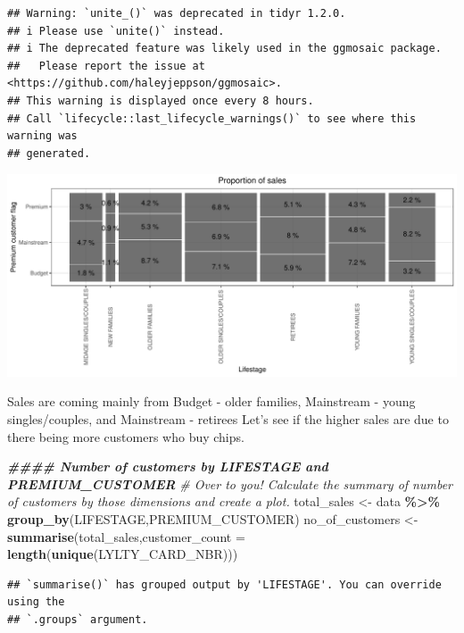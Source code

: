 \documentclass[
]{article}
\newenvironment{Shaded}{\begin{snugshade}}{\end{snugshade}}
\newcommand{\AttributeTok}[1]{\textcolor[rgb]{0.13,0.29,0.53}{#1}}
\newcommand{\CommentTok}[1]{\textcolor[rgb]{0.56,0.35,0.01}{\textit{#1}}}
\newcommand{\DocumentationTok}[1]{\textcolor[rgb]{0.56,0.35,0.01}{\textbf{\textit{#1}}}}
\newcommand{\FunctionTok}[1]{\textcolor[rgb]{0.13,0.29,0.53}{\textbf{#1}}}
\newcommand{\NormalTok}[1]{#1}
\newcommand{\OtherTok}[1]{\textcolor[rgb]{0.56,0.35,0.01}{#1}}
\newcommand{\SpecialCharTok}[1]{\textcolor[rgb]{0.81,0.36,0.00}{\textbf{#1}}}
\begin{document}
\begin{verbatim}
## Warning: `unite_()` was deprecated in tidyr 1.2.0.
## i Please use `unite()` instead.
## i The deprecated feature was likely used in the ggmosaic package.
##   Please report the issue at <https://github.com/haleyjeppson/ggmosaic>.
## This warning is displayed once every 8 hours.
## Call `lifecycle::last_lifecycle_warnings()` to see where this warning was
## generated.
\end{verbatim}

\begin{center}\includegraphics{InsideSherpa_Task1_files/figure-latex/unnamed-chunk-14-1} \end{center}

Sales are coming mainly from Budget - older families, Mainstream - young
singles/couples, and Mainstream - retirees Let's see if the higher sales
are due to there being more customers who buy chips.

\begin{Shaded}
\begin{Highlighting}[]
\DocumentationTok{\#\#\#\# Number of customers by LIFESTAGE and PREMIUM\_CUSTOMER}
\CommentTok{\# Over to you! Calculate the summary of number of customers by those dimensions and create a plot.}
\NormalTok{total\_sales }\OtherTok{\textless{}{-}}\NormalTok{ data }\SpecialCharTok{\%\textgreater{}\%} \FunctionTok{group\_by}\NormalTok{(LIFESTAGE,PREMIUM\_CUSTOMER)}
\NormalTok{no\_of\_customers }\OtherTok{\textless{}{-}} \FunctionTok{summarise}\NormalTok{(total\_sales,}\AttributeTok{customer\_count =} \FunctionTok{length}\NormalTok{(}\FunctionTok{unique}\NormalTok{(LYLTY\_CARD\_NBR))) }
\end{Highlighting}
\end{Shaded}

\begin{verbatim}
## `summarise()` has grouped output by 'LIFESTAGE'. You can override using the
## `.groups` argument.
\end{verbatim}
\end{document}
